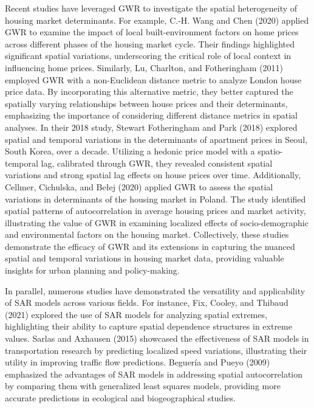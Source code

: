 \documentclass[
  default,
]{sn-jnl}
\begin{document}
Recent studies have leveraged GWR to investigate the spatial
heterogeneity of housing market determinants. For example, C.-H. Wang
and Chen (2020) applied GWR to examine the impact of local
built-environment factors on home prices across different phases of the
housing market cycle. Their findings highlighted significant spatial
variations, underscoring the critical role of local context in
influencing home prices. Similarly, Lu, Charlton, and Fotheringham
(2011) employed GWR with a non-Euclidean distance metric to analyze
London house price data. By incorporating this alternative metric, they
better captured the spatially varying relationships between house prices
and their determinants, emphasizing the importance of considering
different distance metrics in spatial analyses. In their 2018 study,
Stewart Fotheringham and Park (2018) explored spatial and temporal
variations in the determinants of apartment prices in Seoul, South
Korea, over a decade. Utilizing a hedonic price model with a
spatio-temporal lag, calibrated through GWR, they revealed consistent
spatial variations and strong spatial lag effects on house prices over
time. Additionally, Cellmer, Cichulska, and Bełej (2020) applied GWR to
assess the spatial variations in determinants of the housing market in
Poland. The study identified spatial patterns of autocorrelation in
average housing prices and market activity, illustrating the value of
GWR in examining localized effects of socio-demographic and
environmental factors on the housing market. Collectively, these studies
demonstrate the efficacy of GWR and its extensions in capturing the
nuanced spatial and temporal variations in housing market data,
providing valuable insights for urban planning and policy-making.

In parallel, numerous studies have demonstrated the versatility and
applicability of SAR models across various fields. For instance, Fix,
Cooley, and Thibaud (2021) explored the use of SAR models for analyzing
spatial extremes, highlighting their ability to capture spatial
dependence structures in extreme values. Sarlas and Axhausen (2015)
showcased the effectiveness of SAR models in transportation research by
predicting localized speed variations, illustrating their utility in
improving traffic flow predictions. Beguería and Pueyo (2009) emphasized
the advantages of SAR models in addressing spatial autocorrelation by
comparing them with generalized least squares models, providing more
accurate predictions in ecological and biogeographical studies.
\end{document}
